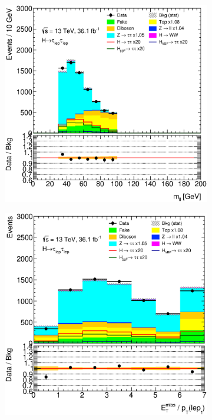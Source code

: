 \begin{figure}[htb]
\begin{subfigure}[t]{0.3\textwidth}
    \end{subfigure}
    \begin{subfigure}[t]{0.3\textwidth}
        \includegraphics[width=\textwidth]{./plots/mva/modeling/input_vars/BOOST_DF/ll-CutMVABoostedCatDF-mvis-lin.eps}
    \end{subfigure}
    \begin{subfigure}[t]{0.3\textwidth}
        \includegraphics[width=\textwidth]{./plots/mva/modeling/input_vars/BOOST_DF/ll-CutMVABoostedCatDF-RatioMETPtL1-lin.eps}

\end{subfigure}
\end{figure}
